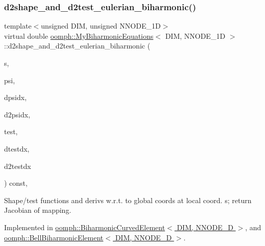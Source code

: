\subsubsection{\texorpdfstring{d2shape\+\_\+and\+\_\+d2test\+\_\+eulerian\+\_\+biharmonic()}{d2shape\_and\_d2test\_eulerian\_biharmonic()}\hspace{0.1cm}{\footnotesize\ttfamily [1/2]}}
{\footnotesize\ttfamily template$<$unsigned D\+IM, unsigned N\+N\+O\+D\+E\+\_\+1D$>$ \\
virtual double \hyperlink{classoomph_1_1MyBiharmonicEquations}{oomph\+::\+My\+Biharmonic\+Equations}$<$ D\+IM, N\+N\+O\+D\+E\+\_\+1D $>$\+::d2shape\+\_\+and\+\_\+d2test\+\_\+eulerian\+\_\+biharmonic (\begin{DoxyParamCaption}\item[{const Vector$<$ double $>$ \&}]{s,  }\item[{Shape \&}]{psi,  }\item[{D\+Shape \&}]{dpsidx,  }\item[{D\+Shape \&}]{d2psidx,  }\item[{Shape \&}]{test,  }\item[{D\+Shape \&}]{dtestdx,  }\item[{D\+Shape \&}]{d2testdx }\end{DoxyParamCaption}) const\hspace{0.3cm}{\ttfamily [protected]}, {}}



Shape/test functions and derivs w.\+r.\+t. to global coords at local coord. s; return Jacobian of mapping. 



Implemented in \hyperlink{classoomph_1_1BiharmonicCurvedElement_aabae0edfbfa93f138e7a2c6421dfcfcd}{oomph\+::\+Biharmonic\+Curved\+Element$<$ D\+I\+M, N\+N\+O\+D\+E\+\_\+D $>$}, and \hyperlink{classoomph_1_1BellBiharmonicElement_af26cb1e9c4980ae4b0911238820f6ae1}{oomph\+::\+Bell\+Biharmonic\+Element$<$ D\+I\+M, N\+N\+O\+D\+E\+\_\+D $>$}.

\mbox{\label{classoomph_1_1MyBiharmonicEquations_a4597b3938b6f1244d6e8e0f58250c14a}} 
